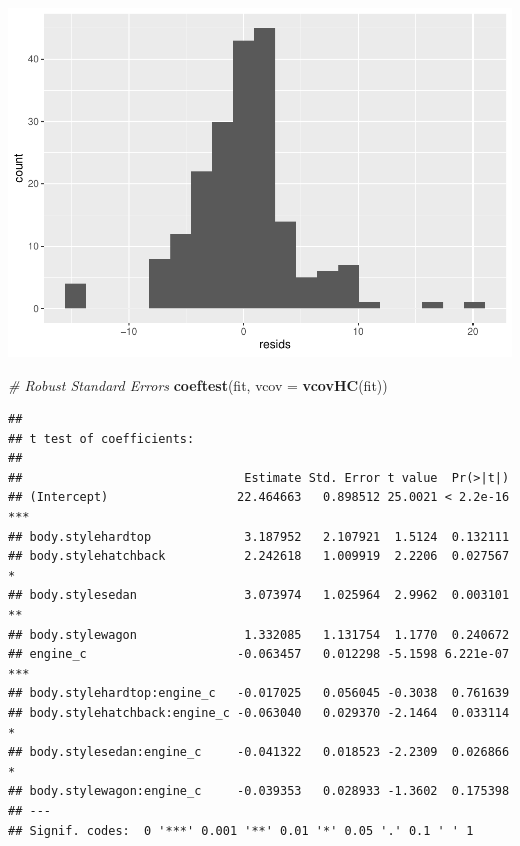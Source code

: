 \documentclass[]{article}
\newenvironment{Shaded}{\begin{snugshade}}{\end{snugshade}}
\newcommand{\KeywordTok}[1]{\textcolor[rgb]{0.13,0.29,0.53}{\textbf{#1}}}
\newcommand{\DataTypeTok}[1]{\textcolor[rgb]{0.13,0.29,0.53}{#1}}
\newcommand{\CommentTok}[1]{\textcolor[rgb]{0.56,0.35,0.01}{\textit{#1}}}
\newcommand{\NormalTok}[1]{#1}
\begin{document}
\begin{center}\includegraphics{project2_files/figure-latex/unnamed-chunk-3-4} \end{center}

\begin{Shaded}
\begin{Highlighting}[]
\CommentTok{# Robust Standard Errors}
\KeywordTok{coeftest}\NormalTok{(fit, }\DataTypeTok{vcov =} \KeywordTok{vcovHC}\NormalTok{(fit))}
\end{Highlighting}
\end{Shaded}

\begin{verbatim}
## 
## t test of coefficients:
## 
##                               Estimate Std. Error t value  Pr(>|t|)    
## (Intercept)                  22.464663   0.898512 25.0021 < 2.2e-16 ***
## body.stylehardtop             3.187952   2.107921  1.5124  0.132111    
## body.stylehatchback           2.242618   1.009919  2.2206  0.027567 *  
## body.stylesedan               3.073974   1.025964  2.9962  0.003101 ** 
## body.stylewagon               1.332085   1.131754  1.1770  0.240672    
## engine_c                     -0.063457   0.012298 -5.1598 6.221e-07 ***
## body.stylehardtop:engine_c   -0.017025   0.056045 -0.3038  0.761639    
## body.stylehatchback:engine_c -0.063040   0.029370 -2.1464  0.033114 *  
## body.stylesedan:engine_c     -0.041322   0.018523 -2.2309  0.026866 *  
## body.stylewagon:engine_c     -0.039353   0.028933 -1.3602  0.175398    
## ---
## Signif. codes:  0 '***' 0.001 '**' 0.01 '*' 0.05 '.' 0.1 ' ' 1
\end{verbatim}
\end{document}
